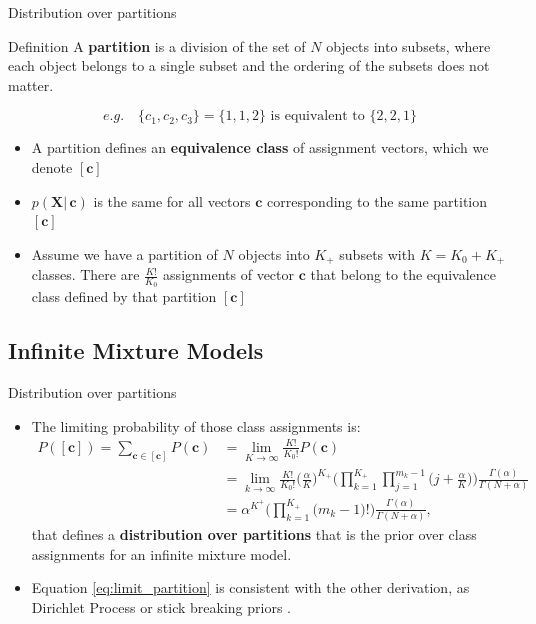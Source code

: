 \documentclass[aspectratio=169,xcolor=dvipsnames]{beamer}
\newcommand{\vecc}{\textbf{c}}
\newcommand{\matx}{\textbf{X}}
\newcommand{\aOverK}{\frac{\alpha}{K}}
\begin{document}
\begin{frame}{Distribution over partitions}
\setlength{\leftmargini}{0.2cm}
\begin{block}{Definition}
A \textbf{partition} is a division of the set of $N$ objects into subsets, where each object belongs to a single subset and the ordering of the subsets does not matter.
\end{block}
\begin{equation*}
    e.g. \quad \{c_1, c_2, c_3\} = \{1, 1, 2\} \text{ is equivalent to } \{2, 2, 1\}
\end{equation*}
\begin{itemize} 
\item A partition defines an \textbf{equivalence class} of assignment vectors, which we denote $[\vecc]$
\item $p(\matx |\,\vecc)$ is the same for all vectors $\vecc$ corresponding to the same partition $[\vecc]$
\item Assume we have a partition of $N$ objects into $K_+$ subsets with $K = K_0 + K_+$ classes. There are $\frac{K!}{K_0}$ assignments of vector $\vecc$ that belong to the equivalence class defined by that partition  $[\vecc]$

\end{itemize}  
\end{frame}
\subsection{Infinite Mixture Models}
\begin{frame}{Distribution over partitions}
\setlength{\leftmargini}{0.2cm}
\begin{itemize} 
\item The limiting probability of those class assignments is:
\begin{align}
    P([\vecc]) = \sum_{\vecc\in[\vecc]}P(\vecc) &= \lim_{K\rightarrow\infty} \frac{K!}{K_0!}P(\vecc) \nonumber \\
    &=\lim_{k\rightarrow\infty} \frac{K!}{K_0!} \Big(\aOverK\Big)^{K_+} \bigg( \prod_{k=1}^{K_{+}} \prod_{j=1}^{m_k-1}\Big(j+\aOverK\Big) \bigg) \frac{\Gamma(\alpha)}{\Gamma(N+\alpha)} \nonumber \\
    &=  \alpha^{K^+} \bigg( \prod_{k=1}^{K_{+}}\Big(m_k - 1\Big)! \bigg) \frac{\Gamma(\alpha)}{\Gamma(N+\alpha)}, \label{eq:limit_partition}
\end{align}
that defines a \textbf{distribution over partitions} that is the prior over class assignments for an infinite mixture model.
\item Equation \ref{eq:limit_partition} is consistent with the other derivation, as Dirichlet Process \citep{blackwel_mcq_73} or stick breaking priors \citep{sethuraman94}.
\end{itemize}  
\end{frame}
\end{document}
